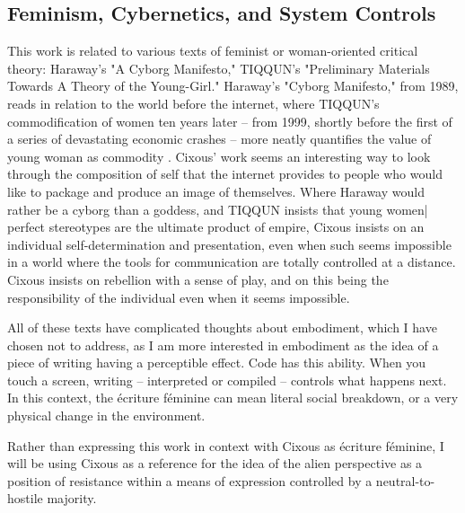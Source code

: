 \subsection{Feminism, Cybernetics, and System Controls}
This work is related to various texts of feminist or woman-oriented critical theory: Haraway's "A Cyborg Manifesto," TIQQUN's "Preliminary Materials Towards A Theory of the Young-Girl." Haraway's "Cyborg Manifesto," from 1989, reads in relation to the world before the internet, where TIQQUN's commodification of women ten years later – from 1999, shortly before the first of a series of devastating economic crashes – more neatly quantifies the value of young woman as commodity \parencite{cixous}\parencite{tiqqun}. Cixous' work seems an interesting way to look through the composition of self that the internet provides to people who would like to package and produce an image of themselves. Where Haraway would rather be a cyborg than a goddess, and TIQQUN insists that young women| perfect stereotypes are the ultimate product of empire, Cixous insists on an individual self-determination and presentation, even when such seems impossible in a world where the tools for communication are totally controlled at a distance. Cixous insists on rebellion with a sense of play, and on this being the responsibility of the individual even when it seems impossible. 

All of these texts have complicated thoughts about embodiment, which I have chosen not to address, as I am more interested in embodiment as the idea of a piece of writing having a perceptible effect. Code has this ability. When you touch a screen, writing – interpreted or compiled – controls what happens next. In this context, the écriture féminine can mean literal social breakdown, or a very physical change in the environment.

Rather than expressing this work in context with Cixous as écriture féminine, I will be using Cixous as a reference for the idea of the alien perspective as a position of resistance within a means of expression controlled by a neutral-to-hostile majority.

